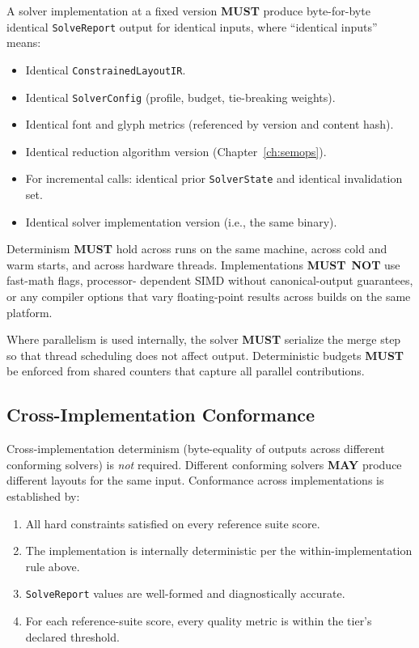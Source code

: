 \documentclass[11pt,letterpaper]{report}
\newcounter{requirement}[chapter]
\newcommand{\MUST}{\textbf{MUST}}
\newcommand{\MUSTNOT}{\textbf{MUST}\nobreak\ \textbf{NOT}}
\newcommand{\MAY}{\textbf{MAY}}
\begin{document}
\begin{requirement}
  \label{req:solver:within-implementation-byte-stability}
  A solver implementation at a fixed version \MUST{} produce
  byte-for-byte identical \texttt{SolveReport} output for
  identical inputs, where ``identical inputs'' means:

  \begin{itemize}
    \item Identical \texttt{ConstrainedLayoutIR}.
    \item Identical \texttt{SolverConfig} (profile, budget,
      tie-breaking weights).
    \item Identical font and glyph metrics (referenced by version
      and content hash).
    \item Identical reduction algorithm version
      (Chapter~\ref{ch:semops}).
    \item For incremental calls: identical prior
      \texttt{SolverState} and identical invalidation set.
    \item Identical solver implementation version (i.e., the same
      binary).
  \end{itemize}

  Determinism \MUST{} hold across runs on the same machine, across
  cold and warm starts, and across hardware threads.
  Implementations \MUSTNOT{} use fast-math flags, processor-
  dependent SIMD without canonical-output guarantees, or any
  compiler options that vary floating-point results across builds
  on the same platform.

  Where parallelism is used internally, the solver \MUST{}
  serialize the merge step so that thread scheduling does not
  affect output. Deterministic budgets \MUST{} be enforced from
  shared counters that capture all parallel contributions.
\end{requirement}

\subsection{Cross-Implementation Conformance}

\begin{requirement}
  \label{req:solver:cross-implementation-conformance}
  Cross-implementation determinism (byte-equality of outputs
  across different conforming solvers) is \emph{not} required.
  Different conforming solvers \MAY{} produce different layouts
  for the same input. Conformance across implementations is
  established by:

  \begin{enumerate}
    \item All hard constraints satisfied on every reference suite
      score.
    \item The implementation is internally deterministic per the
      within-implementation rule above.
    \item \texttt{SolveReport} values are well-formed and
      diagnostically accurate.
    \item For each reference-suite score, every quality metric is
      within the tier's declared threshold.
  \end{enumerate}
\end{requirement}
\end{document}
